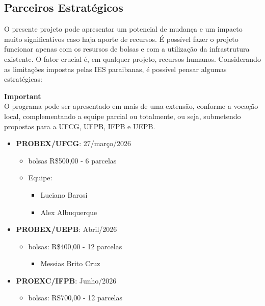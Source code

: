 \subsection{Parceiros Estratégicos}

O presente projeto pode apresentar um potencial de mudança e um impacto muito significativos caso haja aporte de recursos. É possível fazer o projeto funcionar apenas com os resursos de bolsas e com a utilização da infrastrutura existente. O fator crucial é, em qualquer projeto, recursos humanos. Considerando as limitações impostas pelas IES paraibanas, é possível pensar algumas estratégicas:

\begin{framed}
\textbf{Important}\\
O programa pode ser apresentado em mais de uma extensão, conforme a vocação local, complementando a equipe parcial ou totalmente, ou seja, submetendo propostas para a UFCG, UFPB, IFPB e UEPB.

\begin{itemize}
\item \textbf{PROBEX/UFCG}: 27/março/2026

\begin{itemize}
\item bolsas R\$500,00 - 6 parcelas
\item Equipe:

\begin{itemize}
\item Luciano Barosi
\item Alex Albuquerque
\end{itemize}
\end{itemize}


\item \textbf{PROBEX/UEPB}:  Abril/2026

\begin{itemize}
\item bolsas: R\$400,00 - 12 parcelas

\begin{itemize}
\item Messias Brito Cruz
\end{itemize}
\end{itemize}


\item \textbf{PROEXC/IFPB}: Junho/2026

\begin{itemize}
\item bolsas: RS700,00 - 12 parcelas


\end{itemize}
\end{itemize}
\end{framed}
